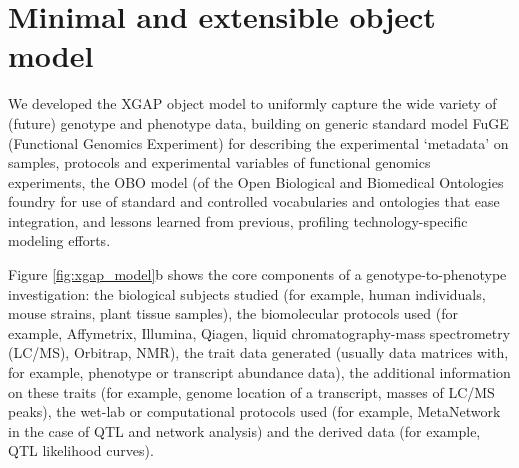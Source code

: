 \section{Minimal and extensible object model}
We developed the XGAP object model to uniformly capture the wide variety of (future) genotype and phenotype data, building on generic standard model FuGE (Functional Genomics Experiment)\cite{Jones_2007} for describing the experimental ‘metadata’ on samples, protocols and experimental variables of functional genomics experiments, the OBO model (of the Open Biological and Biomedical Ontologies foundry for use of standard and controlled vocabularies and ontologies that ease integration\cite{Smith_2007}, and lessons learned from previous, profiling technology-specific modeling efforts\cite{Brazma_2006}.

Figure \ref{fig:xgap_model}b shows the core components of a genotype-to-phenotype investigation: the biological subjects studied (for example, human individuals, mouse strains, plant tissue samples), the biomolecular protocols used (for example, Affymetrix, Illumina, Qiagen, liquid chromatography-mass spectrometry (LC/MS), Orbitrap, NMR), the trait data generated (usually data matrices with, for example, phenotype or transcript abundance data), the additional information on these traits (for example, genome location of a transcript, masses of LC/MS peaks), the wet-lab or computational protocols used (for example, MetaNetwork\cite{Fu_2007} in the case of QTL and network analysis) and the derived data (for example, QTL likelihood curves).

